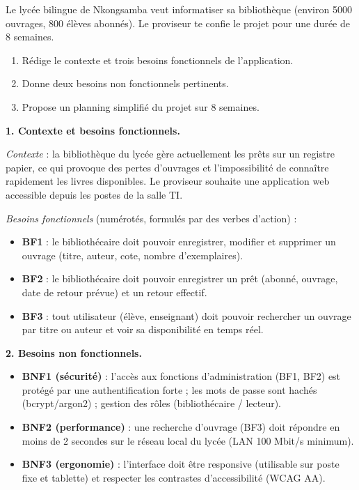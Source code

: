\documentclass[11pt]{article}
\begin{document}
\begin{exoresolu}
Le lycée bilingue de Nkongsamba veut informatiser sa bibliothèque (environ 5000 ouvrages, 800 élèves abonnés). Le proviseur te confie le projet pour une durée de 8 semaines.
\begin{enumerate}
\item Rédige le contexte et trois besoins fonctionnels de l'application.
\item Donne deux besoins non fonctionnels pertinents.
\item Propose un planning simplifié du projet sur 8 semaines.
\end{enumerate}
\tcblower
\textbf{1. Contexte et besoins fonctionnels.}

\emph{Contexte} : la bibliothèque du lycée gère actuellement les prêts sur un registre papier, ce qui provoque des pertes d'ouvrages et l'impossibilité de connaître rapidement les livres disponibles. Le proviseur souhaite une application web accessible depuis les postes de la salle TI.

\emph{Besoins fonctionnels} (numérotés, formulés par des verbes d'action) :
\begin{itemize}
\item \textbf{BF1} : le bibliothécaire doit pouvoir enregistrer, modifier et supprimer un ouvrage (titre, auteur, cote, nombre d'exemplaires).
\item \textbf{BF2} : le bibliothécaire doit pouvoir enregistrer un prêt (abonné, ouvrage, date de retour prévue) et un retour effectif.
\item \textbf{BF3} : tout utilisateur (élève, enseignant) doit pouvoir rechercher un ouvrage par titre ou auteur et voir sa disponibilité en temps réel.
\end{itemize}

\textbf{2. Besoins non fonctionnels.}
\begin{itemize}
\item \textbf{BNF1 (sécurité)} : l'accès aux fonctions d'administration (BF1, BF2) est protégé par une authentification forte ; les mots de passe sont hachés (bcrypt/argon2) ; gestion des rôles (bibliothécaire / lecteur).
\item \textbf{BNF2 (performance)} : une recherche d'ouvrage (BF3) doit répondre en moins de 2 secondes sur le réseau local du lycée (LAN 100 Mbit/s minimum).
\item \textbf{BNF3 (ergonomie)} : l'interface doit être responsive (utilisable sur poste fixe et tablette) et respecter les contrastes d'accessibilité (WCAG AA).
\end{itemize}


\end{exoresolu}
\end{document}
